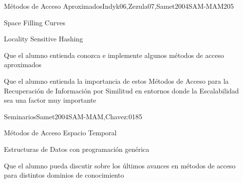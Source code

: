 \begin{syllabus}
\begin{unit}{Métodos de Acceso Aproximados}{Indyk06,Zezula07,Samet2004SAM-MAM}{20}{5}
   \begin{topics}
         \item Space Filling Curves
         \item Locality Sensitive Hashing
   \end{topics}

   \begin{learningoutcomes}
         \item Que el alumno entienda conozca e implemente algunos métodos de acceso aproximados
         \item Que el alumno entienda la importancia de estos Métodos de Acceso para la Recuperación de Información por Similitud en entornos donde la Escalabilidad sea una factor muy importante
   \end{learningoutcomes}
\end{unit}

\begin{unit}{Seminarios}{Samet2004SAM-MAM,Chavez:01}{8}{5}
	\begin{topics}
         \item Métodos de Acceso Espacio Temporal
         \item Estructuras de Datos con programación genérica
   \end{topics}

   \begin{learningoutcomes}
         \item Que el alumno pueda discutir sobre los últimos avances en métodos de acceso para distintos dominios de conocimiento
   \end{learningoutcomes}
\end{unit}



\begin{coursebibliography}
\end{coursebibliography}

\end{syllabus}
